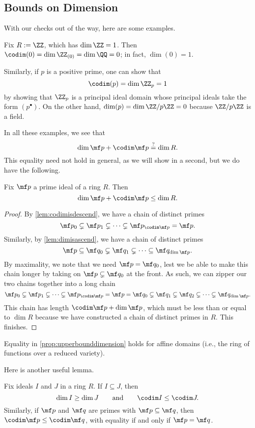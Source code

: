 \subsection{Bounds on Dimension}
With our checks out of the way, here are some examples.
\begin{example}
	Fix $R:=\ZZ$, which has $\dim\ZZ=1$. Then $\codim(0)=\dim\ZZ_{(0)}=\dim\QQ=0$; in fact, $\dim(0)=1$.
\end{example}
\begin{example}
	Similarly, if $p$ is a positive prime, one can show that
	\[\codim(p)=\dim\ZZ_p=1\]
	by showing that $\ZZ_p$ is a principal ideal domain whose principal ideals take the form $\left(p^\bullet\right)$. On the other hand, $\dim(p)=\dim\ZZ/p\ZZ=0$ because $\ZZ/p\ZZ$ is a field.
\end{example}
In all these examples, we see that
\[\dim\mf p+\codim\mf p\stackrel?=\dim R.\]
This equality need not hold in general, as we will show in a second, but we do have the following.
\begin{proposition} \label{prop:upperbounddimension}
	Fix $\mf p$ a prime ideal of a ring $R$. Then
	\[\dim\mf p+\codim\mf p\le\dim R.\]
\end{proposition}
\begin{proof}
	By \autoref{lem:codimisdescend}, we have a chain of distinct primes
	\[\mf p_0\subsetneq\mf p_1\subsetneq\cdots\subsetneq\mf p_{\codim\mf p}=\mf p.\]
	Similarly, by \autoref{lem:dimisascend}, we have a chain of distinct primes
	\[\mf p\subseteq\mf q_0\subsetneq\mf q_1\subsetneq\cdots\subseteq\mf q_{\dim\mf p}.\]
	By maximality, we note that we need $\mf p=\mf q_0$, lest we be able to make this chain longer by taking on $\mf p\subsetneq\mf q_0$ at the front. As such, we can zipper our two chains together into a long chain
	\[\mf p_0\subsetneq\mf p_1\subsetneq\cdots\subsetneq\mf p_{\codim\mf p}=\mf p=\mf q_0\subsetneq\mf q_1\subsetneq\mf q_2\subsetneq\cdots\subsetneq\mf q_{\dim\mf p}.\]
	This chain has length $\codim\mf p+\dim\mf p$, which must be less than or equal to $\dim R$ because we have constructed a chain of distinct primes in $R$. This finishes.
\end{proof}
\begin{remark}
	Equality in \autoref{prop:upperbounddimension} holds for affine domains (i.e., the ring of functions over a reduced variety).
\end{remark}
Here is another useful lemma.
\begin{lemma} \label{lem:diminclusionbounds}
	Fix ideals $I$ and $J$ in a ring $R$. If $I\subseteq J$, then
	\[\dim I\ge\dim J\qquad\text{and}\qquad\codim I\le\codim J.\]
	Similarly, if $\mf p$ and $\mf q$ are primes with $\mf p\subseteq\mf q$, then $\codim\mf p\le\codim\mf q$, with equality if and only if $\mf p=\mf q$.
\end{lemma}
